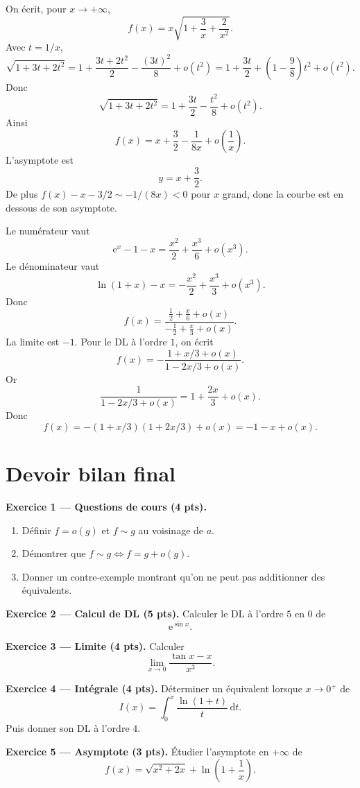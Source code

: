 \documentclass[11pt,a4paper]{article}
\newenvironment{corrige}[1][]{\begin{tcolorbox}[colframe=vertprepa!70!black,colback=green!2!white,title={Correction \ifx\relax#1\relax\else{} — #1\fi}]}{\end{tcolorbox}}
\newcommand{\e}{\mathrm{e}}
\newcommand{\dd}{\mathrm{d}}
\begin{document}
\begin{corrige}[Exercice 9]
On écrit, pour $x\to+\infty$,
\[
  f(x)=x\sqrt{1+\frac3x+\frac2{x^2}}.
\]
Avec $t=1/x$,
\[
  \sqrt{1+3t+2t^2}=1+\frac{3t+2t^2}{2}-\frac{(3t)^2}{8}+o(t^2)
  =1+\frac{3t}{2}+\left(1-\frac98\right)t^2+o(t^2).
\]
Donc
\[
  \sqrt{1+3t+2t^2}=1+\frac{3t}{2}-\frac{t^2}{8}+o(t^2).
\]
Ainsi
\[
  f(x)=x+\frac32-\frac{1}{8x}+o\left(\frac1x\right).
\]
L'asymptote est
\[
  \boxed{y=x+\frac32}.
\]
De plus $f(x)-x-3/2\sim -1/(8x)<0$ pour $x$ grand, donc la courbe est en dessous de son asymptote.
\end{corrige}

\begin{corrige}[Exercice 10]
Le numérateur vaut
\[
  \e^x-1-x=\frac{x^2}{2}+\frac{x^3}{6}+o(x^3).
\]
Le dénominateur vaut
\[
  \ln(1+x)-x=-\frac{x^2}{2}+\frac{x^3}{3}+o(x^3).
\]
Donc
\[
  f(x)=\frac{\frac12+\frac{x}{6}+o(x)}{-\frac12+\frac{x}{3}+o(x)}.
\]
La limite est $-1$.
Pour le DL à l'ordre $1$, on écrit
\[
  f(x)=-\frac{1+x/3+o(x)}{1-2x/3+o(x)}.
\]
Or
\[
  \frac1{1-2x/3+o(x)}=1+\frac{2x}{3}+o(x).
\]
Donc
\[
  f(x)=-(1+x/3)(1+2x/3)+o(x)=-1-x+o(x).
\]
\end{corrige}

\section{Devoir bilan final}

\begin{tcolorbox}[colframe=bleuprepa,colback=blue!2!white,title={Devoir bilan — 3h — Barème indicatif sur 20}]
\textbf{Exercice 1 — Questions de cours (4 pts).}
\begin{enumerate}[label=\alph*)]
\item Définir $f=o(g)$ et $f\sim g$ au voisinage de $a$.
\item Démontrer que $f\sim g\Leftrightarrow f=g+o(g)$.
\item Donner un contre-exemple montrant qu'on ne peut pas additionner des équivalents.
\end{enumerate}

\textbf{Exercice 2 — Calcul de DL (5 pts).} Calculer le DL à l'ordre $5$ en $0$ de
\[
  \e^{\sin x}.
\]

\textbf{Exercice 3 — Limite (4 pts).} Calculer
\[
  \lim_{x\to0}\frac{\tan x-x}{x^3}.
\]

\textbf{Exercice 4 — Intégrale (4 pts).} Déterminer un équivalent lorsque $x\to0^+$ de
\[
  I(x)=\int_0^x \frac{\ln(1+t)}{t}\,\dd t.
\]
Puis donner son DL à l'ordre $4$.

\textbf{Exercice 5 — Asymptote (3 pts).} Étudier l'asymptote en $+\infty$ de
\[
  f(x)=\sqrt{x^2+2x}+\ln\left(1+\frac1x\right).
\]
\end{tcolorbox}
\end{document}
